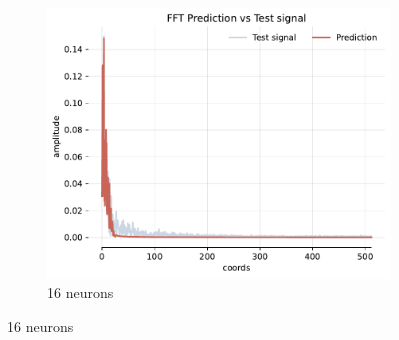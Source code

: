 \begin{figure}[h]
    \begin{subfigure}[b]{0.32\textwidth}
        \centering
        \includegraphics[width=\textwidth]{img/ch4/fft-1hl-16hf-2hz.pdf}
        \caption{16 neurons}
        \label{fig:fft-1hl-16hf-2hz}
    \end{subfigure}


\end{figure}
